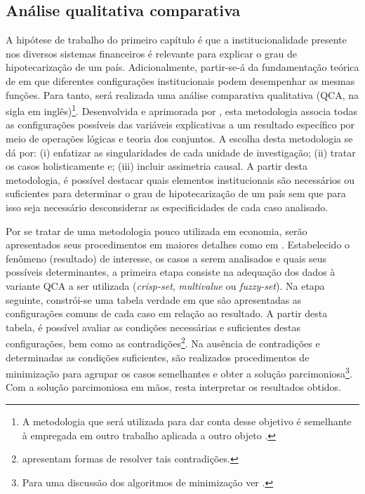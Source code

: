 \subsection{Análise qualitativa comparativa}
 
A hipótese de trabalho do primeiro capítulo é que a institucionalidade presente nos diversos sistemas financeiros é relevante para explicar o grau de hipotecarização de um país.
Adicionalmente, partir-se-á da fundamentação teórica de  \textcite{chang_institutions_2011} em que diferentes configurações institucionais podem desempenhar as mesmas funções. 
Para tanto, será realizada uma  análise comparativa qualitativa (QCA, na sigla em inglês)\footnote{A metodologia que será utilizada para dar conta desse objetivo é semelhante à empregada em outro trabalho aplicada a outro objeto \cite{petrini_comparacao_2019}. 
}. 
Desenvolvida e aprimorada por \textcites{ragin_comparative_1989}{ragin_set_2006}{box-steffensmeier_measurement_2009}, esta metodologia associa todas as configurações possíveis das variáveis explicativas a um resultado específico por meio de operações lógicas e teoria dos conjuntos. 
A escolha desta metodologia se dá por: 
	(i) enfatizar as singularidades de cada unidade de investigação; 
	(ii) tratar os casos holisticamente e; %
	(iii) incluir assimetria causal.
A partir desta metodologia, é possível destacar quais elementos institucionais são necessários ou suficientes para determinar o grau de hipotecarização de um país sem que para isso seja necessário desconsiderar as especificidades de cada caso analisado.

Por se tratar de uma metodologia pouco utilizada em economia, serão apresentados seus procedimentos em maiores detalhes como em \textcite{rihoux_configurational_2009}.
Estabelecido o fenômeno (resultado) de interesse, os casos a serem analisados e quais seus possíveis determinantes, a primeira etapa  consiste na adequação dos dados à variante QCA a ser utilizada (\textit{crisp-set}, \textit{multivalue} ou \textit{fuzzy-set}).
Na etapa seguinte, constrói-se uma tabela verdade em que são apresentadas as configurações comuns de cada caso em relação ao resultado.
A partir desta tabela, é possível avaliar as condições necessárias e suficientes destas configurações, bem como as contradições\footnote{\textcite[p.~48--56]{rihoux_configurational_2009} apresentam formas de resolver tais contradições.}.
Na ausência de contradições e determinadas as condições suficientes, são realizados procedimentos de minimização para agrupar os casos semelhantes e obter a solução parcimoniosa\footnote{Para uma discussão dos algoritmos de minimização ver \textcite{dusa_mathematical_2010}.}.
Com a solução parcimoniosa em mãos, resta interpretar os resultados obtidos.

